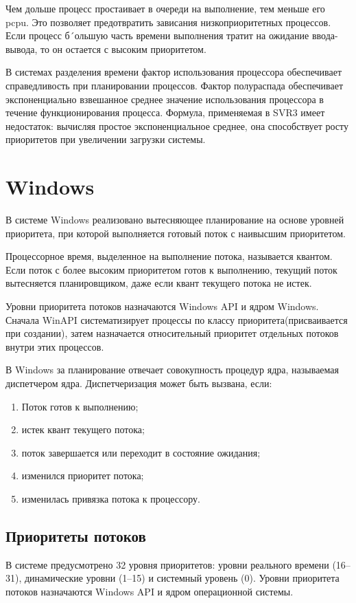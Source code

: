 \documentclass[12pt]{report}
\begin{document}
Чем дольше процесс простаивает в очереди на выполнение, тем меньше его p\textunderscore cpu. Это позволяет предотвратить зависания низкоприоритетных процессов. Если процесс б´ольшую часть времени выполнения тратит на ожидание ввода-вывода, то он остается с высоким приоритетом.

В системах разделения времени фактор использования процессора обеспечивает справедливость при планировании процессов. Фактор полураспада обеспечивает экспоненциально взвешанное среднее значение использования процессора в течение функционирования процесса. Формула, применяемая в SVR3 имеет недостаток: вычисляя простое экспоненциальное среднее, она способствует росту приоритетов при увеличении загрузки системы.
\section{Windows}
В системе Windows реализовано вытесняющее планирование на основе уровней приоритета, при которой выполняется готовый поток с наивысшим приоритетом.

Процессорное время, выделенное на выполнение потока, называется квантом. Если поток с более высоким приоритетом готов к выполнению, текущий поток вытесняется планировщиком, даже если квант текущего потока не истек.

Уровни приоритета потоков назначаются Windows API и ядром Windows. Сначала WinAPI систематизирует процессы по классу приоритета(присваивается при создании), затем назначается относительный приоритет отдельных потоков внутри этих процессов.

\newpage
В Windows за планирование отвечает совокупность процедур ядра, называемая диспетчером ядра. Диспетчеризация может быть вызвана, если:
\begin{enumerate}
	\item Поток готов к выполнению;
	\item истек квант текущего потока;
	\item поток завершается или переходит в состояние ожидания;
	\item изменился приоритет потока;
	\item изменилась привязка потока к процессору.
\end{enumerate}
\subsection{Приоритеты потоков}
В системе предусмотрено 32 уровня приоритетов: уровни реального времени (16–31), динамические уровни (1–15) и системный уровень (0).
Уровни приоритета потоков назначаются Windows API и ядром операционной системы.
\end{document}
